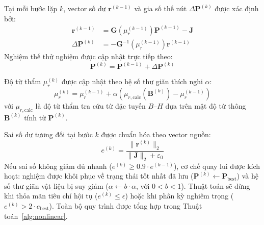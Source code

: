 Tại mỗi bước lặp $k$, vector số dư $\mathbf{r}^{(k-1)}$ và gia số thế nút $\Delta\mathbf{P}^{(k)}$ được xác định bởi:
\begin{align}
    \mathbf{r}^{(k-1)} &= \mathbf{G}(\mu_r^{(k-1)}) \mathbf{P}^{(k-1)} - \mathbf{J} \\
    \Delta\mathbf{P}^{(k)} &= -\mathbf{G}^{-1}(\mu_r^{(k-1)}) \mathbf{r}^{(k-1)}
\end{align}
Nghiệm thế thử nghiệm được cập nhật trực tiếp theo:
\begin{equation}
    \mathbf{P}^{(k)} = \mathbf{P}^{(k-1)} + \Delta\mathbf{P}^{(k)}
\end{equation}

Độ từ thẩm $\mu_r^{(k)}$ được cập nhật theo hệ số thư giãn thích nghi $\alpha$:
\begin{equation}
    \mu_r^{(k)} = \mu_r^{(k-1)} + \alpha \left( \mu_{r,\text{calc}}(\mathbf{B}^{(k)}) - \mu_r^{(k-1)} \right)
\end{equation}
với $\mu_{r,\text{calc}}$ là độ từ thẩm tra cứu từ đặc tuyến $B\text{--}H$ dựa trên mật độ từ thông $\mathbf{B}^{(k)}$ tính từ $\mathbf{P}^{(k)}$.

Sai số dư tương đối tại bước $k$ được chuẩn hóa theo vector nguồn:
\begin{equation}
    e^{(k)} = \frac{\|\mathbf{r}^{(k)}\|_2}{\|\mathbf{J}\|_2 + \varepsilon_0}
\end{equation}
Nếu sai số không giảm đủ nhanh ($e^{(k)} \ge 0.9 \cdot e^{(k-1)}$), cơ chế quay lui được kích hoạt: nghiệm được khôi phục về trạng thái tốt nhất đã lưu ($\mathbf{P}^{(k)} \leftarrow \mathbf{P}_{\text{best}}$) và hệ số thư giãn vật liệu bị suy giảm ($\alpha \leftarrow b \cdot \alpha$, với $0 < b < 1$). Thuật toán sẽ dừng khi thỏa mãn tiêu chí hội tụ ($e^{(k)} \le \epsilon$) hoặc khi phân kỳ nghiêm trọng ($e^{(k)} > 2 \cdot e_{\text{best}}$). Toàn bộ quy trình được tổng hợp trong Thuật toán~\ref{alg:nonlinear}.

